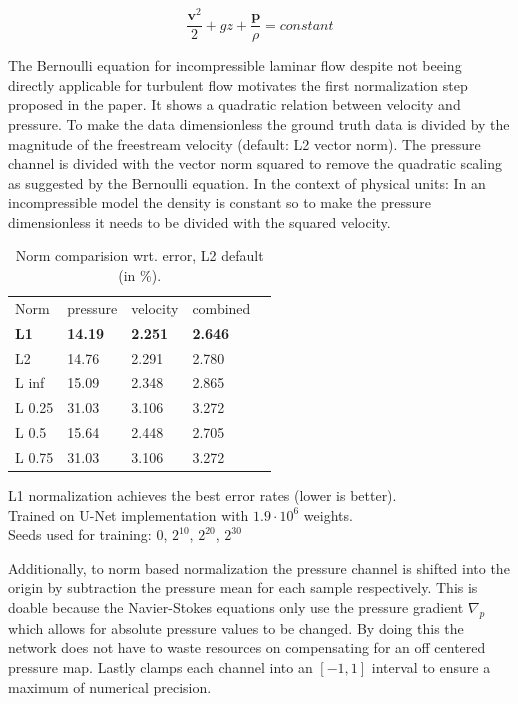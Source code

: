 \documentclass[acmtog]{techreportacmart}
\begin{document}
\begin{equation}
\label{eqn:00}
	\frac{\textbf{v}^2}{2} + gz + \frac{\textbf{p}}{\rho} = constant
\end{equation}

The Bernoulli equation for incompressible laminar flow despite not beeing directly applicable for turbulent flow
motivates the first normalization step proposed in the paper. It shows a quadratic relation between velocity and
pressure. To make the data dimensionless the ground truth data is divided by the magnitude of the freestream 
velocity (default: L2 vector norm). The pressure channel is divided with the vector norm squared to remove the 
quadratic scaling as suggested by the Bernoulli equation.
In the context of physical units: In an incompressible model the density is constant so to make the 
pressure dimensionless it needs to be divided with the squared velocity. \\
\begin{table}
\caption{Norm comparision wrt. error, L2 default (in \%).}
\label{tab:one}
\begin{center}
\begin{tabular}{l|l|l|l|l}
  \toprule
  Norm   & pressure   &	velocity    & combined \\
  \bf L1	 & \bf 14.19	  & \bf 2.251		& \bf 2.646    \\
  L2	 & 14.76	  & 2.291		& 2.780	   \\
  L inf	 & 15.09	  & 2.348		& 2.865	   \\
  L 0.25 & 31.03	  & 3.106		& 3.272	   \\
  L 0.5  & 15.64	  & 2.448		& 2.705	   \\
  L 0.75 & 31.03	  & 3.106		& 3.272	   \\	
  \bottomrule
\end{tabular}
\end{center}
\bigskip\centering
\footnotesize L1 normalization achieves the best error rates (lower is better). \\
Trained on \cite{Thuerey20} U-Net implementation with $1.9 \cdot 10^{6}$ weights. \\
Seeds used for training: $0$, $2^{10}$, $2^{20}$, $2^{30}$
\end{table}%
Additionally, to norm based normalization the pressure channel is shifted into the origin 
by subtraction the pressure mean for each sample respectively. This is doable because the 
Navier-Stokes equations only use the pressure gradient $\nabla_p$ which allows for absolute pressure
values to be changed. By doing this the network does not have to waste resources on 
compensating for an off centered pressure map. Lastly \cite{Thuerey20} clamps each channel 
into an $[-1, 1]$ interval to ensure a maximum of numerical precision.
\end{document}
